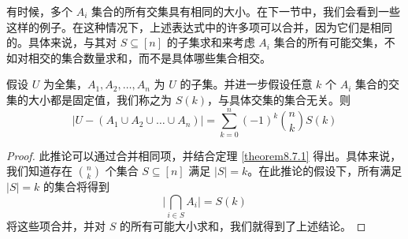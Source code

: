 有时候，多个 $A_i$ 集合的所有交集具有相同的大小。在下一节中，我们会看到一些这样的例子。在这种情况下，上述表达式中的许多项可以合并，因为它们是相同的。具体来说，与其对 $S \subseteq [n]$ 的子集求和来考虑 $A_i$ 集合的所有可能交集，不如对相交的集合数量求和，而不是具体哪些集合相交。

\newpage

\begin{corollary}
    假设 $U$ 为全集，$A_1, A_2, \dots , A_n$ 为 $U$ 的子集。并进一步假设任意 $k$ 个 $A_i$ 集合的交集的大小都是固定值，我们称之为 $S(k)$，与具体交集的集合无关。则
    \[|U - (A_1 \cup A_2 \cup \dots \cup A_n)| = \sum_{k=0}^{n}(-1)^k {n \choose k}S(k)\]
\end{corollary}

\begin{proof}
    此推论可以通过合并相同项，并结合定理 \ref{theorem8.7.1} 得出。具体来说，我们知道存在 ${n \choose k}$ 个集合 $S \subseteq [n]$ 满足 $|S| = k$。在此推论的假设下，所有满足 $|S| = k$ 的集合将得到
    \[\bigg|\bigcap_{i \in S} A_i\bigg|=S(k)\]
    将这些项合并，并对 $S$ 的所有可能大小求和，我们就得到了上述结论。
\end{proof}